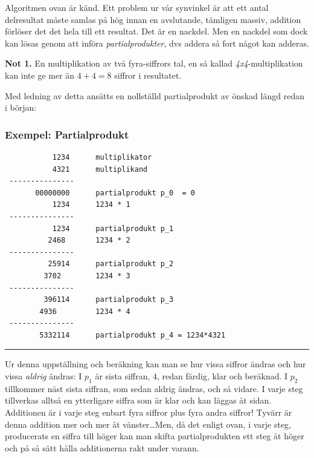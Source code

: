 \documentclass[oneside,10pt,a4paper,swedish]{scrbook}
\newcommand{\slutex}{\vspace{-8mm}\begin{flushright} \rule{1ex}{1ex} \end{flushright}}
\begin{document}
Algoritmen ovan är känd. Ett problem ur vår synvinkel är att ett antal delresultat måste samlas på hög innan en avslutande, tämligen massiv, addition förlöser det det hela till ett resultat. Det är en nackdel. Men en nackdel som dock kan lösas genom att införa \emph{partialprodukter}, dvs addera så fort något kan adderas. 

\textbf{Not 1.} En multiplikation av två fyra-siffrors tal, en så kallad \emph{4x4}-multiplikation kan inte ge mer än $4+4=8$ siffror i resultatet.

\newpage

Med ledning av detta ansätts en nollställd partialprodukt av önskad längd redan i början:

\subsubsection{Exempel: Partialprodukt}
\begin{center}
\begin{lstlisting}
           1234	     multiplikator
           4321      multiplikand
 ---------------
       00000000      partialprodukt p_0  = 0
           1234      1234 * 1
 ---------------
           1234      partialprodukt p_1       
          2468       1234 * 2
 ---------------
          25914      partialprodukt p_2
         3702        1234 * 3
 ---------------       
         396114      partialprodukt p_3
        4936         1234 * 4
 ---------------
        5332114      partialprodukt p_4 = 1234*4321
\end{lstlisting}
\end{center}
\slutex

Ur denna uppställning och beräkning kan man se hur vissa siffror ändras och hur vissa \emph{aldrig} ändras: I $p_1$ är sista siffran, $4$, redan färdig, klar och beräknad. I $p_2$ tillkommer näst sista siffran, som sedan aldrig ändras, och så vidare. I varje steg tillverkas alltså en ytterligare siffra som  är klar och kan läggas åt sidan. Additionen är i varje steg enbart fyra siffror plus fyra andra siffror! Tyvärr är denna addition mer och mer åt vänster\ldots Men, då det enligt ovan, i varje steg, producerats en siffra till höger kan man skifta partialprodukten ett steg åt höger och på så sätt hålla additionerna rakt under varann.
\end{document}
